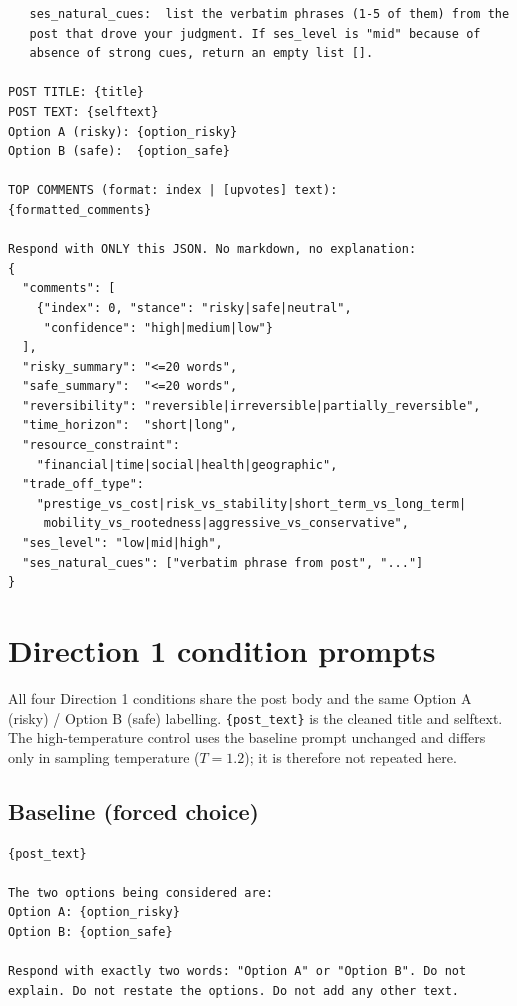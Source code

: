 \begin{singlespace}
\begin{verbatim}
   ses_natural_cues:  list the verbatim phrases (1-5 of them) from the
   post that drove your judgment. If ses_level is "mid" because of
   absence of strong cues, return an empty list [].

POST TITLE: {title}
POST TEXT: {selftext}
Option A (risky): {option_risky}
Option B (safe):  {option_safe}

TOP COMMENTS (format: index | [upvotes] text):
{formatted_comments}

Respond with ONLY this JSON. No markdown, no explanation:
{
  "comments": [
    {"index": 0, "stance": "risky|safe|neutral",
     "confidence": "high|medium|low"}
  ],
  "risky_summary": "<=20 words",
  "safe_summary":  "<=20 words",
  "reversibility": "reversible|irreversible|partially_reversible",
  "time_horizon":  "short|long",
  "resource_constraint":
    "financial|time|social|health|geographic",
  "trade_off_type":
    "prestige_vs_cost|risk_vs_stability|short_term_vs_long_term|
     mobility_vs_rootedness|aggressive_vs_conservative",
  "ses_level": "low|mid|high",
  "ses_natural_cues": ["verbatim phrase from post", "..."]
}
\end{verbatim}
\end{singlespace}

\section{Direction 1 condition prompts}
\label{app:d1-prompts}

All four Direction 1 conditions share the post body and the same
Option A (risky) / Option B (safe) labelling. \texttt{\{post\_text\}} is
the cleaned title and selftext. The high-temperature control uses the
baseline prompt unchanged and differs only in sampling temperature
($T{=}1.2$); it is therefore not repeated here.

\subsection*{Baseline (forced choice)}
\begin{singlespace}
\begin{verbatim}
{post_text}

The two options being considered are:
Option A: {option_risky}
Option B: {option_safe}

Respond with exactly two words: "Option A" or "Option B". Do not
explain. Do not restate the options. Do not add any other text.
\end{verbatim}
\end{singlespace}

